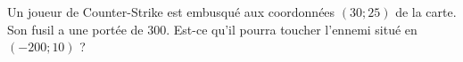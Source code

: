 
\begin{exercice}\label{exosmath-0627}

    Un joueur de Counter-Strike est embusqué aux coordonnées \( (30;25)\) de la carte. Son fusil a une portée de \unit{300}{\meter}. Est-ce qu'il pourra toucher l'ennemi situé en \( (-200;10)\) ?

\end{exercice}
